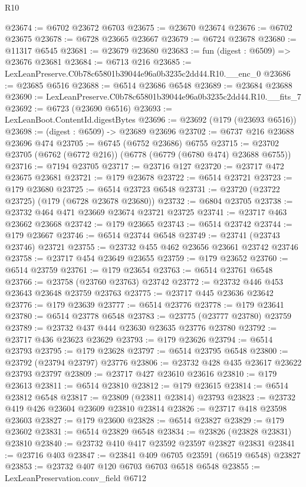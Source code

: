 \begin{lexlean}{R10}
\begin{coremodule}
@23674 := @6702 @23672 @6703
@23675 := @23670 @23674
@23676 := @6702 @23675
@23678 := @6728 @23665 @23667
@23679 := @6724 @23678
@23680 := @11317 @6545
@23681 := @23679 @23680
@23683 := fun (digest : @6509) => @23676 @23681
@23684 := @6713 @216
@23685 := LexLeanPreserve.C0b78c65801b39044e96a0b3235c2dd44.R10.__enc_0
@23686 := @23685 @6516
@23688 := @6514 @23686 @6548
@23689 := @23684 @23688
@23690 := LexLeanPreserve.C0b78c65801b39044e96a0b3235c2dd44.R10.__fits_7
@23692 := @6723 (@23690 @6516)
@23693 := LexLeanBoot.ContentId.digestBytes
@23696 := @23692 (@179 (@23693 @6516))
@23698 := (digest : @6509) -> @23689 @23696
@23702 := @6737 @216 @23688 @23696 @474
@23705 := @6745 (@6752 @23686) @6755
@23715 := @23702 @23705 (@6762 (@6772 @216)) (@6778 (@6779 (@6780 @474) @23688 @6755))
@23716 := @7194 @23705
@23717 := @23716 @127
@23720 := @23717 @472 @23675 @23681
@23721 := @179 @23678
@23722 := @6514 @23721
@23723 := @179 @23680
@23725 := @6514 @23723 @6548
@23731 := @23720 (@23722 @23725) (@179 (@6728 @23678 @23680))
@23732 := @6804 @23705
@23738 := @23732 @464 @471 @23669 @23674 @23721 @23725
@23741 := @23717 @463 @23662 @23668
@23742 := @179 @23665
@23743 := @6514 @23742
@23744 := @179 @23667
@23746 := @6514 @23744 @6548
@23749 := @23741 (@23743 @23746) @23721
@23755 := @23732 @455 @462 @23656 @23661 @23742 @23746
@23758 := @23717 @454 @23649 @23655
@23759 := @179 @23652
@23760 := @6514 @23759
@23761 := @179 @23654
@23763 := @6514 @23761 @6548
@23766 := @23758 (@23760 @23763) @23742
@23772 := @23732 @446 @453 @23643 @23648 @23759 @23763
@23775 := @23717 @445 @23636 @23642
@23776 := @179 @23639
@23777 := @6514 @23776
@23778 := @179 @23641
@23780 := @6514 @23778 @6548
@23783 := @23775 (@23777 @23780) @23759
@23789 := @23732 @437 @444 @23630 @23635 @23776 @23780
@23792 := @23717 @436 @23623 @23629
@23793 := @179 @23626
@23794 := @6514 @23793
@23795 := @179 @23628
@23797 := @6514 @23795 @6548
@23800 := @23792 (@23794 @23797) @23776
@23806 := @23732 @428 @435 @23617 @23622 @23793 @23797
@23809 := @23717 @427 @23610 @23616
@23810 := @179 @23613
@23811 := @6514 @23810
@23812 := @179 @23615
@23814 := @6514 @23812 @6548
@23817 := @23809 (@23811 @23814) @23793
@23823 := @23732 @419 @426 @23604 @23609 @23810 @23814
@23826 := @23717 @418 @23598 @23603
@23827 := @179 @23600
@23828 := @6514 @23827
@23829 := @179 @23602
@23831 := @6514 @23829 @6548
@23834 := @23826 (@23828 @23831) @23810
@23840 := @23732 @410 @417 @23592 @23597 @23827 @23831
@23841 := @23716 @403
@23847 := @23841 @409 @6705 @23591 (@6519 @6548) @23827
@23853 := @23732 @407 @120 @6703 @6703 @6518 @6548
@23855 := LexLeanPreservation.conv_field @6712

\end{coremodule}
\end{lexlean}
